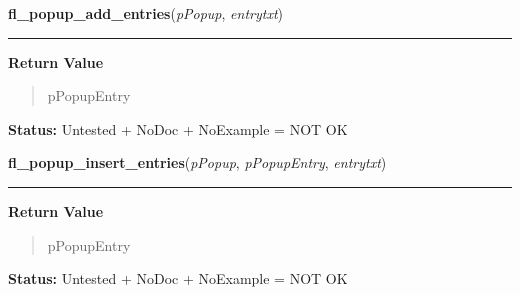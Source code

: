     \label{xformslib:library:fl_popup_add_entries}

    \vspace{0.5ex}

\hspace{.8\funcindent}\begin{boxedminipage}{\funcwidth}

    \raggedright \textbf{fl\_popup\_add\_entries}(\textit{pPopup}, \textit{entrytxt})

    \vspace{-1.5ex}

    \rule{\textwidth}{0.5\fboxrule}
\setlength{\parskip}{2ex}
\setlength{\parskip}{1ex}
      \textbf{Return Value}
    \vspace{-1ex}

      \begin{quote}
      pPopupEntry

      \end{quote}

\textbf{Status:} Untested + NoDoc + NoExample = NOT OK



    \end{boxedminipage}

    \label{xformslib:library:fl_popup_insert_entries}

    \vspace{0.5ex}

\hspace{.8\funcindent}\begin{boxedminipage}{\funcwidth}

    \raggedright \textbf{fl\_popup\_insert\_entries}(\textit{pPopup}, \textit{pPopupEntry}, \textit{entrytxt})

    \vspace{-1.5ex}

    \rule{\textwidth}{0.5\fboxrule}
\setlength{\parskip}{2ex}
\setlength{\parskip}{1ex}
      \textbf{Return Value}
    \vspace{-1ex}

      \begin{quote}
      pPopupEntry

      \end{quote}

\textbf{Status:} Untested + NoDoc + NoExample = NOT OK



    \end{boxedminipage}

